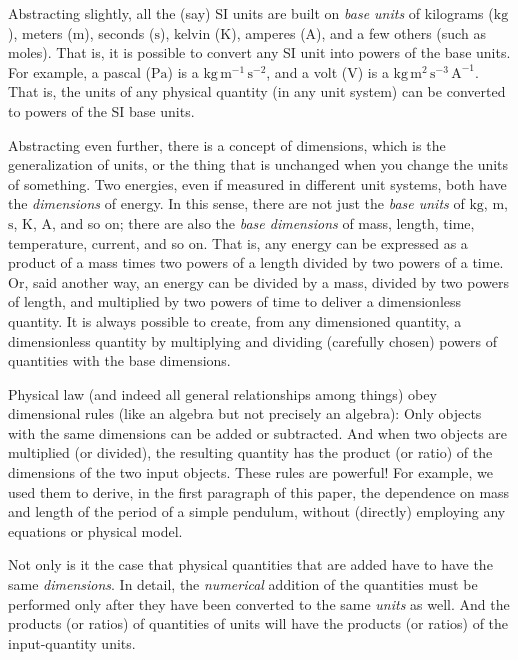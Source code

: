 \documentclass[nohyperref]{article}
\theoremstyle{plain}
\theoremstyle{definition}
\theoremstyle{remark}
\newcommand{\unit}[1]{\mathrm{#1}}
\newcommand{\kg}{\unit{kg}}
\newcommand{\m}{\unit{m}}
\newcommand{\s}{\unit{s}}
\newcommand{\K}{\unit{K}}
\newcommand{\A}{\unit{A}}
\newcommand{\Pa}{\unit{Pa}}
\newcommand{\V}{\unit{V}}
\begin{document}
Abstracting slightly, all the (say) SI units are built on \emph{base units} of kilograms ($\kg$), meters ($\m$), seconds ($\s$), kelvin ($\K$), amperes ($\A$), and a few others (such as moles).
That is, it is possible to convert any SI unit into powers of the base units.
For example, a pascal ($\Pa$) is a $\kg\,\m^{-1}\,\s^{-2}$, and a volt ($\V$) is a $\kg\,\m^{2}\,\s^{-3}\,\A^{-1}$.
That is, the units of any physical quantity (in any unit system) can be converted to powers of the SI base units.

Abstracting even further, there is a concept of dimensions, which is the generalization of units, or the thing that is unchanged when you change the units of something.
Two energies, even if measured in different unit systems, both have the \emph{dimensions} of energy.
In this sense, there are not just the \emph{base units} of $\kg$, $\m$, $\s$, $\K$, $\A$, and so on; there are also the \emph{base dimensions} of mass, length, time, temperature, current, and so on.
That is, any energy can be expressed as a product of a mass times two powers of a length divided by two powers of a time.
Or, said another way, an energy can be divided by a mass, divided by two powers of length, and multiplied by two powers of time to deliver a dimensionless quantity.
It is always possible to create, from any dimensioned quantity, a dimensionless quantity by multiplying and dividing (carefully chosen) powers of quantities with the base dimensions.

Physical law (and indeed all general relationships among things) obey dimensional rules (like an algebra but not precisely an algebra):
Only objects with the same dimensions can be added or subtracted.
And when two objects are multiplied (or divided), the resulting quantity has the product (or ratio) of the dimensions of the two input objects.
These rules are powerful!
For example, we used them to derive, in the first paragraph of this paper, the dependence on mass and length of the period of a simple pendulum, without (directly) employing any equations or physical model.

Not only is it the case that physical quantities that are added have to have the same \emph{dimensions}.
In detail, the \emph{numerical} addition of the quantities must be performed only after they have been converted to the same \emph{units} as well.
And the products (or ratios) of quantities of units will have the products (or ratios) of the input-quantity units.
\end{document}
